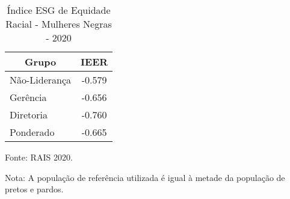 \begin{table}[htb!]
    \centering
    \small
    \caption{Índice ESG de Equidade Racial - Mulheres Negras - 2020}
    \begin{tabular}{lc}
    \hline
    \multicolumn{1}{c}{Grupo} & IEER   \\ \hline
    Não-Liderança             & -0.579 \\
    Gerência                  & -0.656 \\
    Diretoria                 & -0.760 \\
    Ponderado                 & -0.665 \\ \hline
    \end{tabular}
    \label{tab:ieer_2020}
    \begin{floatnotes}
    \item [Fonte:] RAIS 2020.
    \item [Nota:] A população de referência utilizada é igual à metade da população de pretos e pardos.
    \end{floatnotes}
    \end{table}